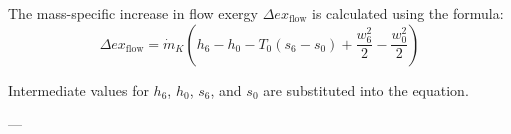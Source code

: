 The mass-specific increase in flow exergy \( \Delta ex_{\text{flow}} \) is calculated using the formula:  
\[
\Delta ex_{\text{flow}} = \dot{m}_K \left( h_6 - h_0 - T_0 (s_6 - s_0) + \frac{w_6^2}{2} - \frac{w_0^2}{2} \right)
\]

Intermediate values for \( h_6 \), \( h_0 \), \( s_6 \), and \( s_0 \) are substituted into the equation.

---